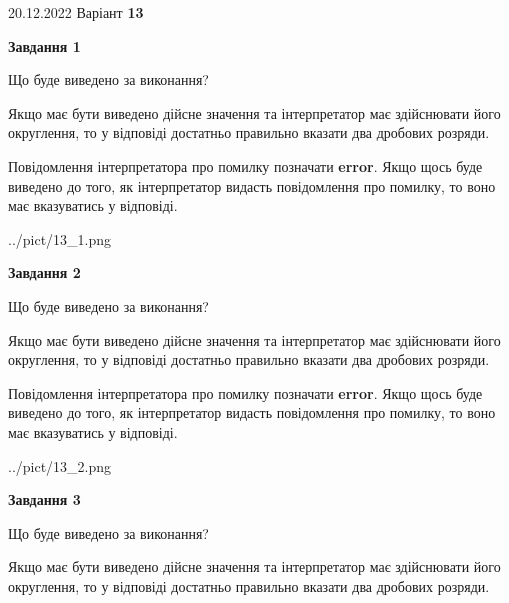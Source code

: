 \documentclass[12pt, ukrainian]{article}
\begin{document}
{20.12.2022 Варіант \No \textbf { 13 }\par}
{
\begin {Large}

{\begin {center}\textbf{Завдання 1}\end {center}}\par
Що буде виведено за виконання? \par

Якщо має бути виведено дійсне значення та інтерпретатор має здійснювати його округлення, 
то у відповіді достатньо правильно вказати два дробових розряди.

Повідомлення інтерпретатора про помилку позначати \textbf{error}.
Якщо щось буде виведено до того, як інтерпретатор видасть повідомлення про помилку, 
то воно має вказуватись у відповіді. \par

\begin{center}
	{../pict/13_1.png}
\end{center}
\newpage

{\begin {center}\textbf{Завдання 2}\end {center}}\par
Що буде виведено за виконання? \par

Якщо має бути виведено дійсне значення та інтерпретатор має здійснювати його округлення, 
то у відповіді достатньо правильно вказати два дробових розряди.

Повідомлення інтерпретатора про помилку позначати \textbf{error}.
Якщо щось буде виведено до того, як інтерпретатор видасть повідомлення про помилку, 
то воно має вказуватись у відповіді. \par

\begin{center}
	{../pict/13_2.png}
\end{center}
\newpage

{\begin {center}\textbf{Завдання 3}\end {center}}\par
Що буде виведено за виконання? \par

Якщо має бути виведено дійсне значення та інтерпретатор має здійснювати його округлення, 
то у відповіді достатньо правильно вказати два дробових розряди.


\end{Large}}
\end{document}
